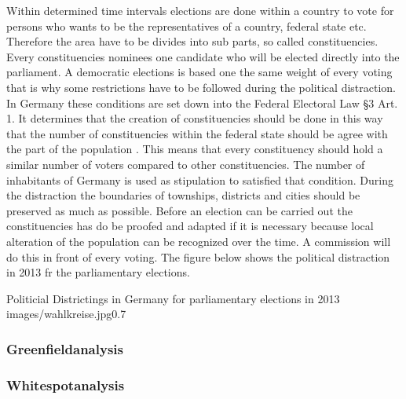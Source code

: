 Within determined time intervals elections are done within a country to vote for persons who wants to be the representatives of a country, federal state etc. Therefore the area have to be divides into sub parts, so called constituencies. Every constituencies nominees one candidate who will be elected directly into the parliament.  A democratic elections is based one the same weight of every voting that is why some restrictions have to be followed during the political distraction. In Germany these conditions are set down into the Federal Electoral Law §3 Art. 1. It determines that the creation of constituencies should be done in this way that the number of constituencies within the federal state should be agree with the part of the population \cite{bund}. This means that every constituency should hold a similar number of voters compared to other constituencies. The number of inhabitants of Germany is used as stipulation to satisfied that condition. During the distraction the boundaries of townships, districts and cities should be preserved as much as possible. Before an election can be carried out the constituencies has do be proofed and adapted if it is necessary because local alteration of the population can be recognized over the time. A commission will do this in front of every voting. The figure below shows the political distraction in 2013 fr the parliamentary elections.


\begin{figurevarSize}{Politicial Districtings in Germany for parliamentary elections in 2013 \cite{bund}}{images/wahlkreise.jpg}{0.7}\end{figurevarSize}


\subsubsection{Greenfieldanalysis}
\subsubsection{Whitespotanalysis}